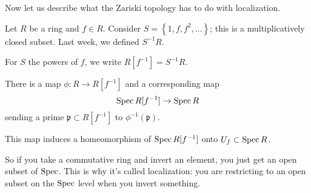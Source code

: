 Now let us describe what the Zariski topology has to do with localization.

\begin{example} 
Let $R$ be a ring and $f \in R$.  Consider $S = \left\{1, f, f^2, \dots
\right\}$; this is a multiplicatively closed subset. Last week, we defined
$S^{-1}R$.
\end{example}

\begin{definition} 
For $S$ the powers of $f$, we write $R[f^{-1}]=S^{-1}R$. 
\end{definition} 

There is  a map $\phi: R \to R[f^{-1}]$ and a corresponding map
\[ \operatorname{Spec} R[f^{-1}] \to \operatorname{Spec} R  \]
sending a prime $\mathfrak{p} \subset R[f^{-1}]$ to $\phi^{-1}(\mathfrak{p})$.

\begin{proposition} 
This map induces a homeomorphism of $\operatorname{Spec} R[f^{-1}]$ onto $U_f \subset \operatorname{Spec}
R$. 
\end{proposition} 

So if you take a commutative ring and invert an element, you just get an open
subset of $\operatorname{Spec}$. This is why it's called localization: you are restricting to
an open subset on the $\operatorname{Spec} $ level when you invert something.

